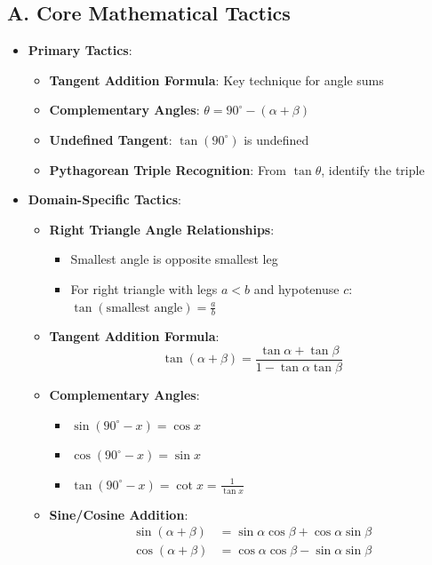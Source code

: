 \documentclass[12pt]{article}
\begin{document}
\begin{tacticalbox}
\subsection*{A. Core Mathematical Tactics}
\begin{itemize}[leftmargin=*]
    \item \textbf{Primary Tactics}: 
    \begin{itemize}
        \item \textbf{Tangent Addition Formula}: Key technique for angle sums
        \item \textbf{Complementary Angles}: $\theta = 90^{\circ} - (\alpha + \beta)$
        \item \textbf{Undefined Tangent}: $\tan(90^{\circ})$ is undefined
        \item \textbf{Pythagorean Triple Recognition}: From $\tan\theta$, identify the triple
    \end{itemize}
    
    \item \textbf{Domain-Specific Tactics}:
    \begin{itemize}
        \item \textbf{Right Triangle Angle Relationships}:
        \begin{itemize}
            \item Smallest angle is opposite smallest leg
            \item For right triangle with legs $a < b$ and hypotenuse $c$: $\tan(\text{smallest angle}) = \frac{a}{b}$
        \end{itemize}
        
        \item \textbf{Tangent Addition Formula}:
        $$\tan(\alpha + \beta) = \frac{\tan\alpha + \tan\beta}{1 - \tan\alpha \tan\beta}$$
        
        \item \textbf{Complementary Angles}:
        \begin{itemize}
            \item $\sin(90^{\circ} - x) = \cos x$
            \item $\cos(90^{\circ} - x) = \sin x$
            \item $\tan(90^{\circ} - x) = \cot x = \frac{1}{\tan x}$
        \end{itemize}
        
        \item \textbf{Sine/Cosine Addition}:
        \begin{align*}
            \sin(\alpha + \beta) &= \sin\alpha \cos\beta + \cos\alpha \sin\beta \\
            \cos(\alpha + \beta) &= \cos\alpha \cos\beta - \sin\alpha \sin\beta
        \end{align*}
        

\end{itemize}
\end{itemize}
\end{tacticalbox}
\end{document}

